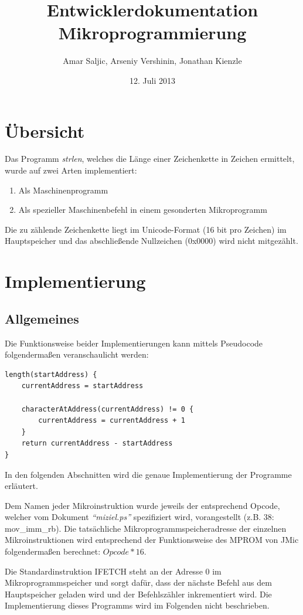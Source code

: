 \documentclass[12pt,a4paper]{article}
\title{Entwicklerdokumentation Mikroprogrammierung}
\author{Amar Saljic, Arseniy Vershinin, Jonathan Kienzle}
\date{12. Juli 2013}
\begin{document}
\maketitle

\thispagestyle{fancy}

\section{Übersicht}

Das Programm \emph{strlen}, welches die Länge einer Zeichenkette in Zeichen ermittelt, wurde auf zwei Arten implementiert:
\begin{enumerate}
\item Als Maschinenprogramm
\item Als spezieller Maschinenbefehl in einem gesonderten Mikroprogramm
\end{enumerate}
Die zu zählende Zeichenkette liegt im Unicode-Format (16 bit pro Zeichen) im Hauptspeicher und das abschließende Nullzeichen (0x0000) wird nicht mitgezählt.

\section{Implementierung}

\subsection{Allgemeines}
Die Funktionsweise beider Implementierungen kann mittels Pseudocode folgendermaßen veranschaulicht werden:
	

\begin{lstlisting}
length(startAddress) {
    currentAddress = startAddress
    
    characterAtAddress(currentAddress) != 0 {
    	currentAddress = currentAddress + 1
    }
    return currentAddress - startAddress
}
\end{lstlisting}
In den folgenden Abschnitten wird die genaue Implementierung der Programme erläutert. 

Dem Namen jeder Mikroinstruktion wurde jeweils der entsprechend Opcode, welcher vom Dokument \emph{``miziel.ps''} spezifiziert wird, vorangestellt (z.B. 38: mov\_imm\_rb). Die tatsächliche Mikroprogrammspeicheradresse der einzelnen Mikroinstruktionen wird entsprechend der Funktionsweise des MPROM von JMic folgendermaßen berechnet: \(Opcode * 16\). 

Die Standardinstruktion IFETCH steht an der Adresse 0 im Mikroprogrammspeicher und sorgt dafür, dass der nächste Befehl aus dem Hauptspeicher geladen wird und der Befehlszähler inkrementiert wird. Die Implementierung dieses Programms wird im Folgenden nicht beschrieben. 
\end{document}
